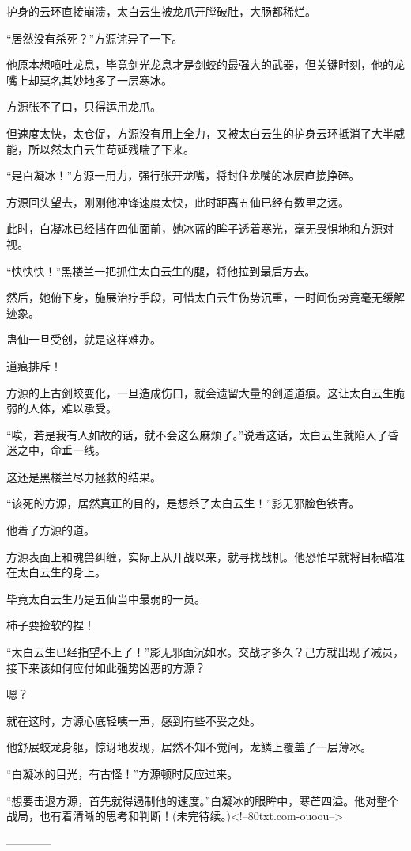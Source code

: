 \begin{this_body}
护身的云环直接崩溃，太白云生被龙爪开膛破肚，大肠都稀烂。

“居然没有杀死？”方源诧异了一下。

他原本想喷吐龙息，毕竟剑光龙息才是剑蛟的最强大的武器，但关键时刻，他的龙嘴上却莫名其妙地多了一层寒冰。

方源张不了口，只得运用龙爪。

但速度太快，太仓促，方源没有用上全力，又被太白云生的护身云环抵消了大半威能，所以然太白云生苟延残喘了下来。

“是白凝冰！”方源一用力，强行张开龙嘴，将封住龙嘴的冰层直接挣碎。

方源回头望去，刚刚他冲锋速度太快，此时距离五仙已经有数里之远。

此时，白凝冰已经挡在四仙面前，她冰蓝的眸子透着寒光，毫无畏惧地和方源对视。

“快快快！”黑楼兰一把抓住太白云生的腿，将他拉到最后方去。

然后，她俯下身，施展治疗手段，可惜太白云生伤势沉重，一时间伤势竟毫无缓解迹象。

蛊仙一旦受创，就是这样难办。

道痕排斥！

方源的上古剑蛟变化，一旦造成伤口，就会遗留大量的剑道道痕。这让太白云生脆弱的人体，难以承受。

“唉，若是我有人如故的话，就不会这么麻烦了。”说着这话，太白云生就陷入了昏迷之中，命垂一线。

这还是黑楼兰尽力拯救的结果。

“该死的方源，居然真正的目的，是想杀了太白云生！”影无邪脸色铁青。

他着了方源的道。

方源表面上和魂兽纠缠，实际上从开战以来，就寻找战机。他恐怕早就将目标瞄准在太白云生的身上。

毕竟太白云生乃是五仙当中最弱的一员。

柿子要捡软的捏！

“太白云生已经指望不上了！”影无邪面沉如水。交战才多久？己方就出现了减员，接下来该如何应付如此强势凶恶的方源？

嗯？

就在这时，方源心底轻咦一声，感到有些不妥之处。

他舒展蛟龙身躯，惊讶地发现，居然不知不觉间，龙鳞上覆盖了一层薄冰。

“白凝冰的目光，有古怪！”方源顿时反应过来。

“想要击退方源，首先就得遏制他的速度。”白凝冰的眼眸中，寒芒四溢。他对整个战局，也有着清晰的思考和判断！(未完待续。)<!--80txt.com-ouoou-->

------------

\end{this_body}

